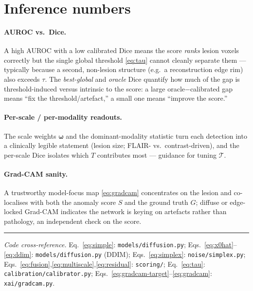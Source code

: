 \documentclass[12pt,a4paper]{article}
\begin{document}
\section{Inference numbers}
\paragraph{AUROC vs.\ Dice.} A high AUROC with a low calibrated Dice means the
score \emph{ranks} lesion voxels correctly but the single global threshold
\eqref{eq:tau} cannot cleanly separate them --- typically because a second,
non-lesion structure (e.g.\ a reconstruction edge rim) also exceeds $\tau$. The
\emph{best-global} and \emph{oracle} Dice quantify how much of the gap is
threshold-induced versus intrinsic to the score: a large oracle$-$calibrated gap
means ``fix the threshold/artefact,'' a small one means ``improve the score.''
\paragraph{Per-scale / per-modality readouts.} The scale weights $\bm\omega$ and
the dominant-modality statistic turn each detection into a clinically legible
statement (lesion size; FLAIR- vs.\ contrast-driven), and the per-scale Dice
isolates which $T$ contributes most --- guidance for tuning $\mathcal T$.
\paragraph{Grad-CAM sanity.} A trustworthy model-focus map \eqref{eq:gradcam}
concentrates on the lesion and co-localises with both the anomaly score $S$ and
the ground truth $G$; diffuse or edge-locked Grad-CAM indicates the network is
keying on artefacts rather than pathology, an independent check on the score.

\bigskip
\hrule
\bigskip
\noindent\textit{Code cross-reference.} Eq.~\eqref{eq:simple}: \texttt{models/diffusion.py};
Eqs.~\eqref{eq:x0hat}--\eqref{eq:ddim}: \texttt{models/diffusion.py} (DDIM);
Eqs.~\eqref{eq:simplex}: \texttt{noise/simplex.py};
Eqs.~\eqref{eq:fusion},\eqref{eq:multiscale},\eqref{eq:residual}: \texttt{scoring/};
Eq.~\eqref{eq:tau}: \texttt{calibration/calibrator.py};
Eqs.~\eqref{eq:gradcam-target}--\eqref{eq:gradcam}: \texttt{xai/gradcam.py}.
\end{document}
